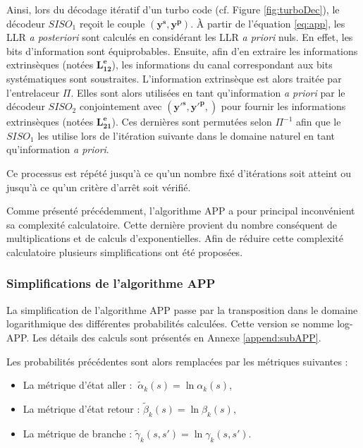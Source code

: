 Ainsi, lors du décodage itératif d'un turbo code (cf. Figure \ref{fig:turboDec}), le décodeur $SISO_1$ reçoit le couple 
$(\mathbf{y^s},\mathbf{y^p})$. À partir de l'équation \ref{eq:app}, les LLR \textit{a posteriori} sont calculés en considérant 
les LLR \textit{a priori} nuls. En effet, les bits d'information sont équiprobables. Ensuite, afin d'en extraire les informations 
extrinsèques (notées $\mathbf{L^e_{12}}$), les informations du canal correspondant aux bits systématiques sont soustraites. 
L'information extrinsèque est alors traitée par l'entrelaceur $\Pi$. Elles sont alors utilisées en tant qu'information 
\textit{a priori} par le décodeur $SISO_2$ conjointement avec $(\mathbf{y'^s},\mathbf{y'^p},)$ pour fournir les informations 
extrinsèques (notées $\mathbf{L^e_{21}}$). Ces dernières sont permutées selon $\Pi^{-1}$ afin que le $SISO_1$ les utilise 
lors de l'itération suivante dans le domaine naturel en tant qu'information \emph{a priori}. 

Ce processus est répété jusqu'à ce qu'un nombre fixé d'itérations soit atteint ou jusqu'à ce qu'un critère d’arrêt 
soit vérifié.

Comme présenté précédemment, l'algorithme APP a pour principal inconvénient sa complexité calculatoire. Cette dernière 
provient du nombre conséquent de multiplications et de calculs d'exponentielles. Afin de réduire cette complexité 
calculatoire plusieurs simplifications ont été proposées.

\subsubsection{Simplifications de l'algorithme APP}
La simplification de l'algorithme APP passe par la transposition dans le domaine logarithmique des différentes probabilités 
calculées. Cette version se nomme log-APP. Les détails des calculs sont présentés en Annexe \ref{append:subAPP}.

Les probabilités précédentes sont alors remplacées par les métriques suivantes : 
\begin{itemize}
	\item La métrique d'état aller : $~\tilde{\alpha}_k(s) = \ln \alpha_k(s)$,
	\item La métrique d'état retour : $\tilde{\beta}_k(s) = \ln \beta_k(s)$,
	\item La métrique de branche : $\tilde{\gamma}_k(s, s') = \ln \gamma_k(s, s')$.\\
\end{itemize}

